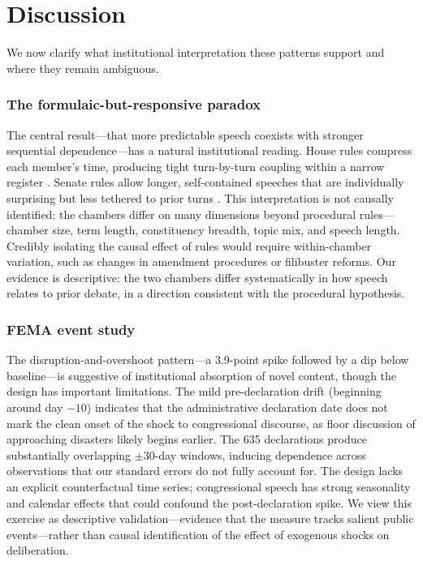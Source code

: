 \documentclass[12pt]{article}
\begin{document}
\section{Discussion}

We now clarify what institutional interpretation these patterns support and where they remain ambiguous.

\subsubsection*{The formulaic-but-responsive paradox} The central result---that more predictable speech coexists with stronger sequential dependence---has a natural institutional reading. House rules compress each member's time, producing tight turn-by-turn coupling within a narrow register \citep{perssonTabellini2003, jenkins2006}. Senate rules allow longer, self-contained speeches that are individually surprising but less tethered to prior turns \citep{lee2009}. This interpretation is not causally identified: the chambers differ on many dimensions beyond procedural rules---chamber size, term length, constituency breadth, topic mix, and speech length. Credibly isolating the causal effect of rules would require within-chamber variation, such as changes in amendment procedures or filibuster reforms. Our evidence is descriptive: the two chambers differ systematically in how speech relates to prior debate, in a direction consistent with the procedural hypothesis.

\subsubsection*{FEMA event study} The disruption-and-overshoot pattern---a 3.9-point spike followed by a dip below baseline---is suggestive of institutional absorption of novel content, though the design has important limitations. The mild pre-declaration drift (beginning around day $-10$) indicates that the administrative declaration date does not mark the clean onset of the shock to congressional discourse, as floor discussion of approaching disasters likely begins earlier. The 635 declarations produce substantially overlapping $\pm30$-day windows, inducing dependence across observations that our standard errors do not fully account for. The design lacks an explicit counterfactual time series; congressional speech has strong seasonality and calendar effects that could confound the post-declaration spike. We view this exercise as descriptive validation---evidence that the measure tracks salient public events---rather than causal identification of the effect of exogenous shocks on deliberation.
\end{document}
